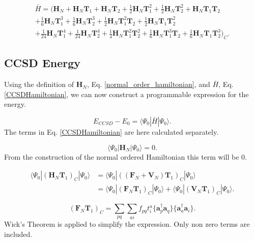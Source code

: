 \documentclass[a4paper,norsk,11pt,twoside]{report}
\begin{document}
\begin{equation}
\begin{split}
\bar{H} = 
\big( \textbf{H}_N + \textbf{H}_N \textbf{T}_1 + \textbf{H}_N \textbf{T}_2
+ \frac{1}{2} \textbf{H}_N \textbf{T}_1^2
+ \frac{1}{2} \textbf{H}_N \textbf{T}_2^2
+ \textbf{H}_N \textbf{T}_1 \textbf{T}_2 \\
+ \frac{1}{6} \textbf{H}_N \textbf{T}_1^3
+ \frac{1}{6} \textbf{H}_N \textbf{T}_2^3
+ \frac{1}{2} \textbf{H}_N \textbf{T}_1^2 \textbf{T}_2
+ \frac{1}{2} \textbf{H}_N \textbf{T}_1 \textbf{T}_2^2 \\ 
+ \frac{1}{24} \textbf{H}_N \textbf{T}_1^4
+ \frac{1}{24} \textbf{H}_N \textbf{T}_2^4
+ \frac{1}{4} \textbf{H}_N \textbf{T}_1^2 \textbf{T}_2^2
+ \frac{1}{6} \textbf{H}_N \textbf{T}_1^3 \textbf{T}_2
+ \frac{1}{6} \textbf{H}_N \textbf{T}_1 \textbf{T}_2^3 \big)_C  .
\end{split} \label{CCSDHamiltonian}
\end{equation}

\subsection{CCSD Energy}
Using the definition of $\textbf{H}_N$, Eq. \eqref{normal_order_hamiltonian}, and $\bar{H}$, Eq. \eqref{CCSDHamiltonian}, we can now construct a programmable expression for the energy. 

\begin{equation}
E_{CCSD} - E_0 = \langle \Psi_0 | \bar{H} | \Psi_0 \rangle .
\end{equation}
The terms in Eq. \eqref{CCSDHamiltonian} are here calculated separately. 

\begin{equation}
\langle \Psi_0 | \textbf{H}_N | \Psi_0 \rangle = 0 .
\end{equation}
From the construction of the normal ordered Hamiltonian this term will be 0.

\begin{align}
\langle \Psi_0 | (\textbf{H}_N \textbf{T}_1)_C | \Psi_0 \rangle & = \langle \Psi_0 | \left((\textbf{F}_N + \textbf{V}_N ) \textbf{T}_1 \right)_C | \Psi_0 \rangle \nonumber \\ &
= \langle \Psi_0 | (\textbf{F}_N \textbf{T}_1)_C | \Psi_0 \rangle + \langle \Psi_0 | (\textbf{V}_N \textbf{T}_1)_C | \Psi_0 \rangle . \label{ene_1}
\end{align}

\begin{equation}
(\textbf{F}_N \textbf{T}_1)_C  = \sum_{pq} \sum_{ai} f_{pq} t_i^a  \{ \textbf{a}^{\dag}_p \textbf{a}_q\}  \{\textbf{a}^{\dag}_a \textbf{a}_i \} . 
\end{equation}
Wick's Theorem is applied to simplify the expression. Only non zero terms are included.
\end{document}
